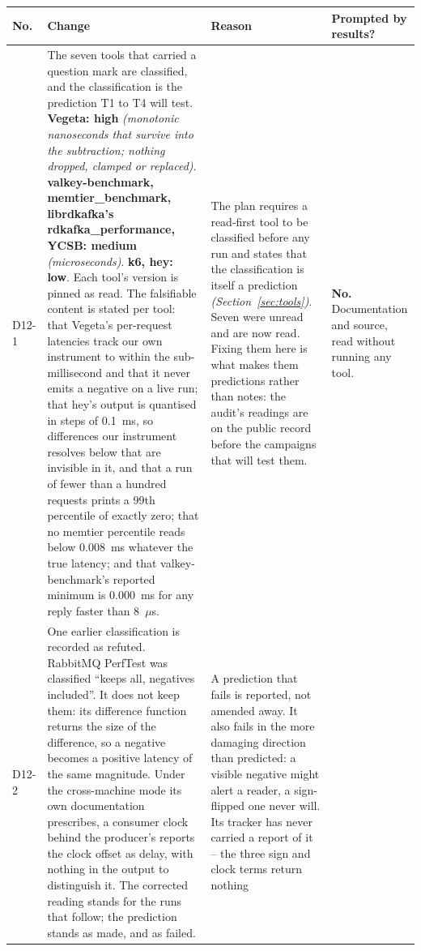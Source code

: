 \documentclass[11pt]{article}
\newcommand{\gl}[1]{{\color{soft}\itshape\small (#1)}}
\begin{document}
{\small
\begin{longtable}{@{}p{1.1cm} >{\raggedright\arraybackslash}p{6.1cm} >{\raggedright\arraybackslash}p{6.0cm} >{\raggedright\arraybackslash}p{2.2cm}@{}}
\toprule
\textbf{No.} & \textbf{Change} & \textbf{Reason} & \textbf{Prompted by results?} \\
\midrule
\endhead
D12-1 & The seven tools that carried a question mark are classified, and the classification is the
prediction T1 to T4 will test. \textbf{Vegeta: high} \gl{monotonic nanoseconds that survive into
the subtraction; nothing dropped, clamped or replaced}. \textbf{valkey-benchmark, memtier\_benchmark,
librdkafka's rdkafka\_performance, YCSB: medium} \gl{microseconds}. \textbf{k6, hey: low}. Each
tool's version is pinned as read. The falsifiable content is stated per tool: that Vegeta's
per-request latencies track our own instrument to within the sub-millisecond and that it never
emits a negative on a live run; that hey's output is quantised in steps of 0.1~ms, so differences
our instrument resolves below that are invisible in it, and that a run of fewer than a hundred
requests prints a 99th percentile of exactly zero; that no memtier percentile reads below
0.008~ms whatever the true latency; and that valkey-benchmark's reported minimum is 0.000~ms for
any reply faster than 8~$\mu$s. & The plan requires a read-first tool to be classified before any
run and states that the classification is itself a prediction \gl{Section~\ref{sec:tools}}. Seven
were unread and are now read. Fixing them here is what makes them predictions rather than notes:
the audit's readings are on the public record before the campaigns that will test them.
& \textbf{No.} Documentation and source, read without running any tool. \\
D12-2 & One earlier classification is recorded as refuted. RabbitMQ PerfTest was classified
``keeps all, negatives included''. It does not keep them: its difference function returns the
size of the difference, so a negative becomes a positive latency of the same magnitude. Under the
cross-machine mode its own documentation prescribes, a consumer clock behind the producer's
reports the clock offset as delay, with nothing in the output to distinguish it. The corrected
reading stands for the runs that follow; the prediction stands as made, and as failed.
& A prediction that fails is reported, not amended away. It also fails in the more damaging
direction than predicted: a visible negative might alert a reader, a sign-flipped one never will.
Its tracker has never carried a report of it -- the three sign and clock terms return nothing

\end{longtable}}
\end{document}
